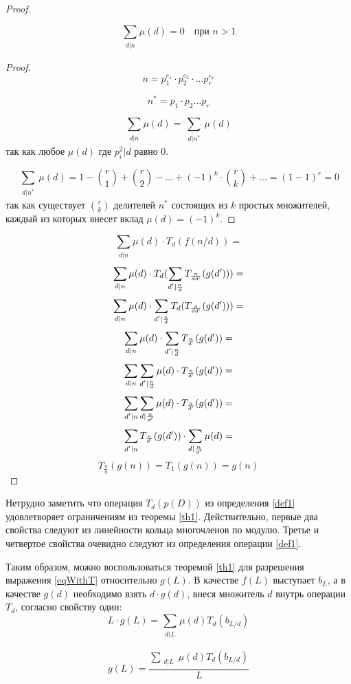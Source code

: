 \documentclass[specification,annotation,times]{itmo-student-thesis}
\begin{document}
\begin{proof}
  
\begin{lemma}
\[
  \sum_{\substack{d|n}}\mu(d)=0 \quad \text{при } n > 1
\]
\end{lemma}


\begin{proof}
  \[
  n = p_1^{e_1} \cdot p_2^{e_2} \cdot \ldots p_r^{e_r}
  \]

\[
n^{\ast}=p_1 \cdot p_2 \ldots p_r
\]

\[
\sum_{\substack{d|n}}\mu(d)=\sum_{\substack{d|n^{\ast}}}\mu(d)
\]
 так как любое $\mu(d)$ где $p_i^2|d$ равно $0$.
 
\[
\sum_{\substack{d|n^{\ast}}}\mu(d)=1-\binom{r}{1}+\binom{r}{2}-\dotsc+(-1)^k \cdot \binom{r}{k}+ \dotsc = (1-1)^r=0
\]
так как существует $\binom{r}{k}$ делителей $n^{\ast}$ состоящих из $k$ простых множителей,
каждый из которых внесет вклад $\mu(d)=(-1)^k$.
\end{proof}


\[
  \sum_{\substack{d|n}}\mu(d) \cdot T_d(f(n/d)) = 
\]
\[
  \sum_{\substack{d|n}}\mu(d) \cdot T_d(\sum_{\substack{d'|\frac{n}{d}}}T_{\frac{n}{dd`}}(g(d'))) =
\]
\[
  \sum_{\substack{d|n}}\mu(d) \cdot \sum_{\substack{d'|\frac{n}{d}}}T_d(T_{\frac{n}{dd`}}(g(d'))) =
\]
\[
  \sum_{\substack{d|n}}\mu(d) \cdot \sum_{\substack{d'|\frac{n}{d}}}T_{\frac{n}{d`}}(g(d')) =
\]
\[
  \sum_{\substack{d|n}}\sum_{\substack{d'|\frac{n}{d}}}\mu(d) \cdot T_{\frac{n}{d`}}(g(d')) =
\]
\[
  \sum_{\substack{d'|n}}\sum_{\substack{d|\frac{n}{d'}}}\mu(d) \cdot T_{\frac{n}{d`}}(g(d')) =
\]
\[
  \sum_{\substack{d'|n}}T_{\frac{n}{d`}}(g(d')) \cdot \sum_{\substack{d|\frac{n}{d'}}}\mu(d)  =
\]
\[
  T_{\frac{n}{n}}(g(n))  = T_1(g(n)) = g(n)
\]
\end{proof}

Нетрудно заметить что операция $T_d(p(D))$ из определения \ref{def1} удовлетворяет ограничениям
из теоремы \ref{th1}. Действительно, первые два свойства следуют из линейности кольца многочленов
по модулю. Третье и четвертое свойства очевидно следуют из определения операции \ref{def1}.

Таким образом, можно воспользоваться теоремой \ref{th1} для разрешения выражения \ref{eqWithT}
относительно $g(L)$. В качестве $f(L)$ выступает $b_L$, а в качестве $g(d)$ необходимо
взять $d \cdot g(d)$, внеся множитель $d$ внутрь операции $T_d$, согласно свойству один:
\[
  L \cdot g(L) = \sum_{\substack{d|L}}\mu(d)T_d(b_{L/d})
\]

\[
  g(L) = \frac{\sum_{\substack{d|L}}\mu(d)T_d(b_{L/d})}{L}
\]
\end{document}

